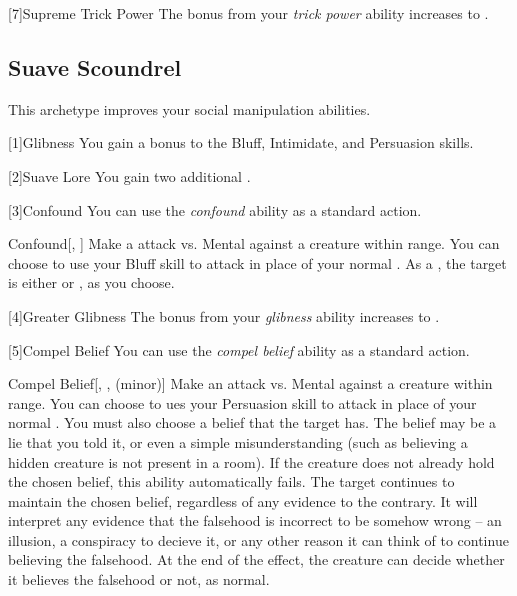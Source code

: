         [7]{Supreme Trick Power}
        The bonus from your \textit{trick power} ability increases to .

    \subsection{Suave Scoundrel}
        This archetype improves your social manipulation abilities.

        [1]{Glibness} You gain a  bonus to the Bluff, Intimidate, and Persuasion skills.

        [2]{Suave Lore} You gain two additional .

        [3]{Confound} You can use the \textit{confound} ability as a standard action.
        \begin{apability}{Confound}[, ]
            Make a attack vs. Mental against a creature within \rngclose range.
            You can choose to use your Bluff skill to attack in place of your normal .
            \hit As a , the target is either  or , as you choose.
        \end{apability}

        [4]{Greater Glibness} The bonus from your \textit{glibness} ability increases to .

        [5]{Compel Belief} You can use the \textit{compel belief} ability as a standard action.
        \begin{apability}{Compel Belief}[, ,  (minor)]
            Make an attack vs. Mental against a creature within \rngmed range.
            You can choose to ues your Persuasion skill to attack in place of your normal .
            You must also choose a belief that the target has.
            The belief may be a lie that you told it, or even a simple misunderstanding (such as believing a hidden creature is not present in a room).
            If the creature does not already hold the chosen belief, this ability automatically fails.
            \hit The target continues to maintain the chosen belief, regardless of any evidence to the contrary.
            It will interpret any evidence that the falsehood is incorrect to be somehow wrong -- an illusion, a conspiracy to decieve it, or any other reason it can think of to continue believing the falsehood.
            At the end of the effect, the creature can decide whether it believes the falsehood or not, as normal.
        \end{apability}

